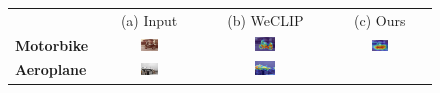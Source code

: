 \begin{figure}[ht]
  \centering
  \setlength{\tabcolsep}{2pt} %
  \renewcommand{\arraystretch}{0.3}

  \begin{tcolorbox}[colframe=black!60, colback=white, boxrule=0.8pt, arc=2pt, left=2pt, right=2pt, top=2pt, bottom=2pt]
    \centering
    \begin{tabular}{m{2.5cm} c c c} %

    & (a) Input & (b) WeCLIP & (c) Ours
    \\
    [1mm]

    {\textbf{Motorbike}}
    & \includegraphics[width=0.18\textwidth,height=0.18\textwidth]{figures/originals/2007_002260}
    & \includegraphics[width=0.18\textwidth,height=0.18\textwidth]{figures/test_cams/weclip/2007_002260_13}
    & \includegraphics[width=0.18\textwidth,height=0.18\textwidth]{figures/test_cams/ours/2007_002260_13}
    \\
    \textbf{Aeroplane}
    & \includegraphics[width=0.18\textwidth,height=0.18\textwidth]{figures/originals/2007_000033}
    & \includegraphics[width=0.18\textwidth,height=0.18\textwidth]{figures/test_cams/weclip/2007_000033_0}

\end{tabular}
\end{tcolorbox}
\end{figure}
